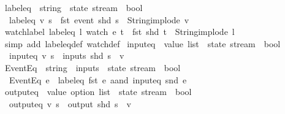 \begin{isabellebody}
\isanewline
{}\isamarkupfalse%
\ label{\isacharunderscore}eq\ {\isacharcolon}{\isacharcolon}\ {\isachardoublequoteopen}string\ {\isasymRightarrow}\ state\ stream\ {\isasymRightarrow}\ bool{\isachardoublequoteclose}\ \isanewline
\ \ {\isachardoublequoteopen}label{\isacharunderscore}eq\ v\ s\ {\isasymequiv}\ fst\ {\isacharparenleft}event\ {\isacharparenleft}shd\ s{\isacharparenright}{\isacharparenright}\ {\isacharequal}\ {\isacharparenleft}String{\isachardot}implode\ v{\isacharparenright}{\isachardoublequoteclose}\isanewline
\isanewline
{}\isamarkupfalse%
\ watch{\isacharunderscore}label{\isacharcolon}\ {\isachardoublequoteopen}label{\isacharunderscore}eq\ l\ {\isacharparenleft}watch\ e\ t{\isacharparenright}\ {\isacharequal}\ {\isacharparenleft}fst\ {\isacharparenleft}shd\ t{\isacharparenright}\ {\isacharequal}\ String{\isachardot}implode\ l{\isacharparenright}{\isachardoublequoteclose}\isanewline
%
\isadelimproof
\ \ %
\endisadelimproof
%
\isatagproof
{}\isamarkupfalse%
\ {\isacharparenleft}simp\ add{\isacharcolon}\ label{\isacharunderscore}eq{\isacharunderscore}def\ watch{\isacharunderscore}def{\isacharparenright}%
\endisatagproof
{\isafoldproof}%
%
\isadelimproof
\isanewline
%
\endisadelimproof
\isanewline
{}\isamarkupfalse%
\ input{\isacharunderscore}eq\ {\isacharcolon}{\isacharcolon}\ {\isachardoublequoteopen}value\ list\ {\isasymRightarrow}\ state\ stream\ {\isasymRightarrow}\ bool{\isachardoublequoteclose}\ \isanewline
\ \ {\isachardoublequoteopen}input{\isacharunderscore}eq\ v\ s\ {\isasymequiv}\ inputs\ {\isacharparenleft}shd\ s{\isacharparenright}\ {\isacharequal}\ v{\isachardoublequoteclose}\isanewline
\isanewline
{}\isamarkupfalse%
\ EventEq\ {\isacharcolon}{\isacharcolon}\ {\isachardoublequoteopen}{\isacharparenleft}string\ {\isasymtimes}\ inputs{\isacharparenright}\ {\isasymRightarrow}\ state\ stream\ {\isasymRightarrow}\ bool{\isachardoublequoteclose}\ \isanewline
\ \ {\isachardoublequoteopen}EventEq\ e\ {\isacharequal}\ label{\isacharunderscore}eq\ {\isacharparenleft}fst\ e{\isacharparenright}\ aand\ input{\isacharunderscore}eq\ {\isacharparenleft}snd\ e{\isacharparenright}{\isachardoublequoteclose}\isanewline
\isanewline
{}\isamarkupfalse%
\ output{\isacharunderscore}eq\ {\isacharcolon}{\isacharcolon}\ {\isachardoublequoteopen}value\ option\ list\ {\isasymRightarrow}\ state\ stream\ {\isasymRightarrow}\ bool{\isachardoublequoteclose}\ \isanewline
\ \ {\isachardoublequoteopen}output{\isacharunderscore}eq\ v\ s\ {\isasymequiv}\ output\ {\isacharparenleft}shd\ s{\isacharparenright}\ {\isacharequal}\ v{\isachardoublequoteclose}\isanewline

\end{isabellebody}
